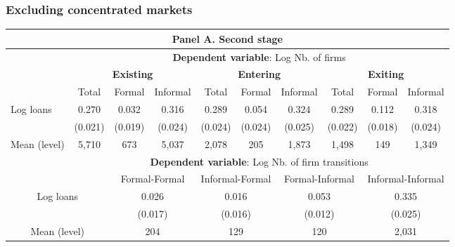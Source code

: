 \documentclass[aspectratio=169]{beamer}
\begin{document}

\begin{frame}[noframenumbering]
\frametitle{\textbf{Excluding concentrated markets}} \label{unconcentrated}

\begin{center}
    \scriptsize
    \begin{tabular}{lccccccccc}
        \toprule
        \multicolumn{10}{c}{\textbf{Panel A. Second stage}} \\
        \midrule
        & \multicolumn{9}{c}{\textbf{Dependent variable}: Log Nb. of firms} \\
        \cmidrule(lr){2-10}
         & \multicolumn{3}{c}{\textbf{Existing}} & \multicolumn{3}{c}{\textbf{Entering}} & \multicolumn{3}{c}{\textbf{Exiting}} \\
        \cmidrule(lr){2-10}
        & Total 
        & Formal 
        & \multicolumn{1}{c}{Informal}
        & Total 
        & Formal 
        & \multicolumn{1}{c}{Informal}
        & Total 
        & Formal 
        & Informal \\
        \midrule
        Log loans 
        &  0.270  & 0.032  & 0.316   &  0.289  & 0.054   & 0.324  & 0.289   & 0.112   & 0.318 \\
        & (0.021) & (0.019) & (0.024) & (0.024) & (0.024) & (0.025) & (0.022) & (0.018) & (0.024) \\
        \midrule
        Mean (level) & 5,710 & 673 & 5,037 & 2,078 & 205 & 1,873 & 1,498 & 149 & 1,349\\
        \midrule
        
        
        & \multicolumn{9}{c}{\textbf{Dependent variable}: Log Nb. of firm transitions} \\
        \cmidrule(lr){3-10}
        \multicolumn{2}{c}{} & \multicolumn{2}{c}{Formal-Formal} & \multicolumn{2}{c}{Informal-Formal} & \multicolumn{2}{c}{Formal-Informal} & \multicolumn{2}{c}{Informal-Informal} \\
        \midrule 
        \multicolumn{2}{c}{Log loans} & \multicolumn{2}{c}{0.026} & \multicolumn{2}{c}{0.016} & \multicolumn{2}{c}{0.053} & \multicolumn{2}{c}{0.335} \\
        \multicolumn{2}{c}{} & \multicolumn{2}{c}{(0.017)} & \multicolumn{2}{c}{(0.016)} & \multicolumn{2}{c}{(0.012)} & \multicolumn{2}{c}{(0.025)} \\
        \midrule
        \multicolumn{2}{c}{Mean (level)} & \multicolumn{2}{c}{204} & \multicolumn{2}{c}{129} & \multicolumn{2}{c}{120} & \multicolumn{2}{c}{2,031} \\
        
        \bottomrule
    \end{tabular}
\end{center}

\hyperlink{main_result}{}

\end{frame}
\end{document}
